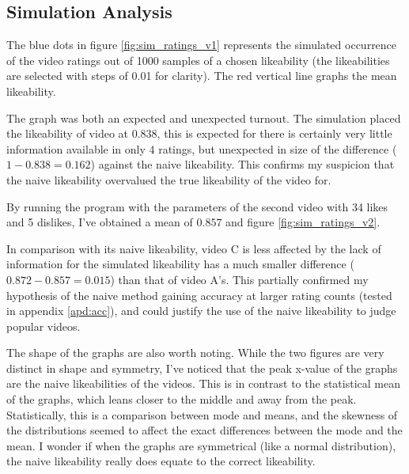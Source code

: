 \documentclass[a4paper,11pt]{article}
\begin{document}
\subsection{Simulation Analysis}
The blue dots in figure \ref{fig:sim_ratings_v1} represents the simulated occurrence of the video ratings out of 1000 samples of a chosen likeability (the likeabilities are selected with steps of 0.01 for clarity). The red vertical line graphs the mean likeability.

The graph was both an expected and unexpected turnout. The simulation placed the likeability of video at $0.838$, this is expected for there is certainly very little information available in only 4 ratings, but unexpected in size of the difference ($1-0.838=0.162$) against the naive likeability. This confirms my suspicion that the naive likeability overvalued the true likeability of the video for.

By running the program with the parameters of the second video with 34 likes and 5 dislikes,
I've obtained a mean of $0.857$ and figure \ref{fig:sim_ratings_v2}.

In comparison with its naive likeability, video C is less affected by the lack of information for the simulated likeability has a much smaller difference ($0.872-0.857=0.015$) than that of video A's. This partially confirmed my hypothesis of the naive method gaining accuracy at larger rating counts (tested in appendix \ref{apd:acc}), and could justify the use of the naive likeability to judge popular videos.

The shape of the graphs are also worth noting.
While the two figures are very distinct in shape and symmetry, I've noticed that the peak x-value of the graphs are the naive likeabilities of the videos. This is in contrast to the statistical mean of the graphs, which leans closer to the middle and away from the peak. Statistically, this is a comparison between mode and means, and the skewness of the distributions seemed to affect the exact differences between the mode and the mean. I wonder if when the graphs are symmetrical (like a normal distribution), the naive likeability really does equate to the correct likeability.

\end{document}
